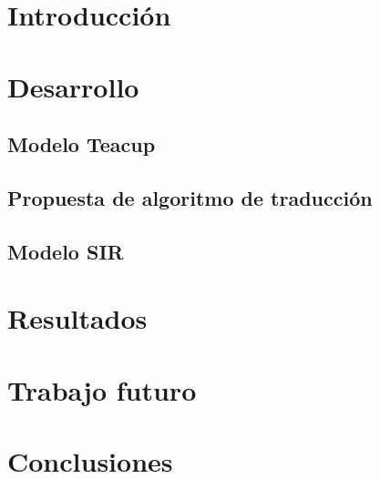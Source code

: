 \documentclass[11pt, a4paper]{article}
\begin{document}

\maketitle
\newpage

\tableofcontents
\newpage

%
\section{Introducción}


\section{Desarrollo}

\subsection{Modelo Teacup}

\subsection{Propuesta de algoritmo de traducción}


\subsection{Modelo SIR}


\section{Resultados}


\section{Trabajo futuro}


%
\section{Conclusiones}

%
\end{document}

